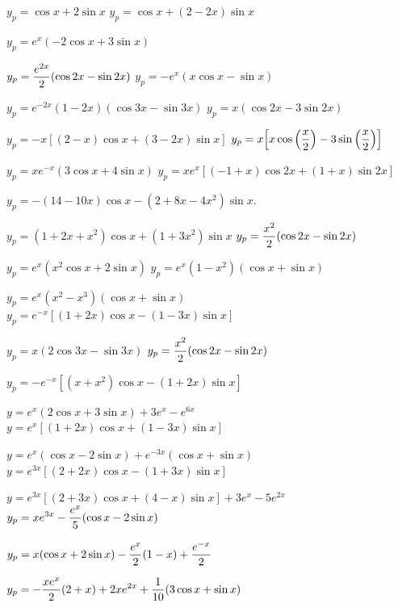 \medskip

 $y_{p}=\cos x+2\sin x$
 $y_{p}=\cos x+(2-2x)\sin x$

 $y_{p}=e^{x}(-2\cos x+3\sin x)$

 $y_{p}=\displaystyle{\frac{e^{2x}}{2}(\cos2x-\sin2x)}$
 $y_{p}=-e^{x}(x\cos x-\sin x)$

 $y_{p}=e^{-2x}(1-2x)(\cos3x-\sin3x)$
 $y_{p}=x(\cos2x-3\sin2x)$

 $y_{p}=-x\left[(2-x)\cos x+(3-2x)\sin x\right]$
 $y_{p}=x\displaystyle{\left[x\cos\left(\frac{x}{2}\right)
-3\sin\left(\frac{x}{2}\right)\right]}$

 $y_{p}=xe^{-x}(3\cos x+4\sin x)$
 $y_{p}=xe^{x}\left[(-1+x)\cos2x+(1+x)\sin
2x\right]$

$y_{p}=-(14-10x)\cos x-(2+8x-4x^{2})\sin x$.

 $y_{p}=(1+2x+x^{2})\cos x+(1+3x^{2})\sin x$
 $y_{p}=\displaystyle\frac{x^{2}}{2}(\cos2x-\sin2x)$

 $y_{p}=e^{x}(x^{2}\cos x+2\sin x)$
 $y_{p}=e^{x}(1-x^{2})(\cos x+\sin x)$

 $y_{p}=e^{x}(x^{2}-x^{3})(\cos x+\sin x)$
 $y_{p}=e^{-x}\left[(1+2x)\cos x-(1-3x)\sin
x\right]$

 $y_{p}=x(2\cos3x-\sin3x)$
 $y_{p}=\displaystyle\frac{x^{2}}{2}(\cos2x-\sin2x)$

$y_{p}=-e^{-x}\left[(x+x^{2})\cos x-(1+2x)\sin x\right]$

$y=e^{x}(2\cos x+3\sin x)+3e^{x}-e^{6x}$
$y=e^{x}\left[(1+2x)\cos x+(1-3x)\sin x\right]$

  $y=e^{x}(\cos x-2\sin x)+e^{-3x}(\cos x+\sin x)$
$y=e^{3x}\left[(2+2x)\cos x-(1+3x)\sin x\right]$

$y=e^{3x}\left[(2+3x)\cos x+(4-x)\sin x\right]+3e^{x}-5e^{2x}$
 $y_{p}=\displaystyle{xe^{3x}-\frac{e^{x}}{5}(\cos x-2\sin
x)}$

  $y_{p}=\displaystyle{x(\cos x+2\sin
x)-\frac{e^{x}}{2}(1-x)+\frac{e^{-x}}{2}}$

$y_{p}=\displaystyle{-\frac{xe^{x}}{2}(2+x)+2xe^{2x}+\frac{1}{10}(3\cos x+\sin x)}$

